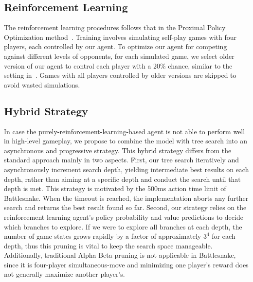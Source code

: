 \documentclass[conference]{IEEEtran}
\begin{document}
\subsection{Reinforcement Learning}

The reinforcement learning procedures follows that in the Proximal Policy
Optimization method~\cite{schulman2017proximal}.
Training involves simulating self-play games with four players,
each controlled by our agent.
To optimize our agent for competing against different levels of opponents,
for each simulated game,
we select older version of our agent to control each player with a 20\% chance,
similar to the setting in~\cite{silver2017mastering}.
Games with all players controlled by older versions are skipped to avoid wasted
simulations.

\subsection{Hybrid Strategy}

In case the purely-reinforcement-learning-based agent is not able to perform
well in high-level gameplay,
we propose to combine the model with tree search into an
asynchronous and progressive strategy.
This hybrid strategy differs from the standard approach mainly in two aspects.
First, our tree search iteratively and asynchronously increment search depth,
yielding intermediate best results on each depth,
rather than aiming at a specific depth and conduct the search until that depth
is met.
This strategy is motivated by the 500ms action time limit of Battlesnake.
When the timeout is reached,
the implementation aborts any further search and returns the best result found
so far. Second,
our strategy relies on the reinforcement learning agent's policy probability and
value predictions to decide which branches to explore.
If we were to explore all branches at each depth,
the number of game states grows rapidly by a factor of approximately $3^4$ for
each depth, thus this pruning is vital to keep the search space manageable.
Additionally, traditional Alpha-Beta pruning is not applicable in Battlesnake,
since it is four-player simultaneous-move and minimizing one player's reward
does not generally maximize another player's.
\end{document}
